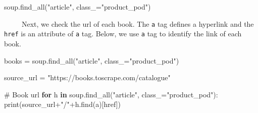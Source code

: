 \documentclass[
  letterpaper,
  DIV=11,
  numbers=noendperiod]{scrreprt}
\newenvironment{Shaded}{\begin{snugshade}}{\end{snugshade}}
\newcommand{\BuiltInTok}[1]{\textcolor[rgb]{0.00,0.23,0.31}{#1}}
\newcommand{\CommentTok}[1]{\textcolor[rgb]{0.37,0.37,0.37}{#1}}
\newcommand{\ControlFlowTok}[1]{\textcolor[rgb]{0.00,0.23,0.31}{\textbf{#1}}}
\newcommand{\KeywordTok}[1]{\textcolor[rgb]{0.00,0.23,0.31}{\textbf{#1}}}
\newcommand{\NormalTok}[1]{\textcolor[rgb]{0.00,0.23,0.31}{#1}}
\newcommand{\OperatorTok}[1]{\textcolor[rgb]{0.37,0.37,0.37}{#1}}
\newcommand{\StringTok}[1]{\textcolor[rgb]{0.13,0.47,0.30}{#1}}
\begin{document}
\begin{Shaded}
\begin{Highlighting}[]
\NormalTok{soup.find\_all(}\StringTok{"article"}\NormalTok{, class\_}\OperatorTok{=}\StringTok{"product\_pod"}\NormalTok{)}
\end{Highlighting}
\end{Shaded}

~~~~~Next, we check the url of each book. The \texttt{a} tag defines a
hyperlink and the \texttt{href} is an attribute of \texttt{a} tag.
Below, we use \texttt{a} tag to identify the link of each book.

\begin{Shaded}
\begin{Highlighting}[]
\NormalTok{books }\OperatorTok{=}\NormalTok{ soup.find\_all(}\StringTok{"article"}\NormalTok{, class\_}\OperatorTok{=}\StringTok{"product\_pod"}\NormalTok{)}
\end{Highlighting}
\end{Shaded}

\begin{Shaded}
\begin{Highlighting}[]
\NormalTok{source\_url }\OperatorTok{=} \StringTok{"https://books.toscrape.com/catalogue"}
\end{Highlighting}
\end{Shaded}

\begin{Shaded}
\begin{Highlighting}[]
\CommentTok{\# Book url }
\ControlFlowTok{for}\NormalTok{ h }\KeywordTok{in}\NormalTok{ soup.find\_all(}\StringTok{"article"}\NormalTok{, class\_}\OperatorTok{=}\StringTok{"product\_pod"}\NormalTok{):}
    \BuiltInTok{print}\NormalTok{(source\_url}\OperatorTok{+}\StringTok{"/"}\OperatorTok{+}\NormalTok{h.find(}\StringTok{\textquotesingle{}a\textquotesingle{}}\NormalTok{)[}\StringTok{\textquotesingle{}href\textquotesingle{}}\NormalTok{])}
\end{Highlighting}
\end{Shaded}
\end{document}
